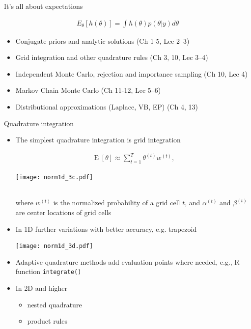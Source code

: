 \documentclass[english,t]{beamer}
\DeclareMathOperator{\E}{E}
\begin{document}
 \begin{frame}{It's all about expectations}

   \begin{align*}
   E_{\theta}[h(\theta)] = \int h(\theta) p(\theta|y) d\theta
   \end{align*}

  \begin{itemize}
  \item Conjugate priors and analytic solutions (Ch 1-5, Lec 2--3)
  \item Grid integration and other quadrature rules (Ch 3, 10, Lec 3--4)
  \item Independent Monte Carlo, rejection and importance sampling (Ch 10, Lec 4)
  \item Markov Chain Monte Carlo (Ch 11-12, Lec 5--6)
  \item {\color{gray}Distributional approximations (Laplace, VB, EP) (Ch 4, 13)}
  \end{itemize}
   

 \end{frame}


\begin{frame}{Quadrature integration}

  \begin{itemize}
  \item The simplest quadrature integration is grid integration\\
    \hspace{0cm}\begin{minipage}{3.5cm}
    \begin{align*}
      \E[\theta] \approx \sum_{t=1}^{T} \theta^{(t)}w^{(t)} ,
    \end{align*}
  \end{minipage}
  \begin{minipage}{6cm}
  \texttt{[image: norm1d\_3c.pdf]}
\end{minipage}\\
where $w^{(t)}$ is the normalized probability of a grid cell $t$, and $\alpha^{(t)}$ and $\beta^{(t)}$ are center locations of grid cells
\item<2-> In 1D further variations with better accuracy, e.g. trapezoid
  \begin{center}
    \texttt{[image: norm1d\_3d.pdf]}
  \end{center}
  \vspace{-0.7\baselineskip}
\item<3-> Adaptive quadrature methods add evaluation points where needed{\color{gray}, e.g., R function \texttt{integrate()}}
\item<4-> In 2D and higher
  \begin{itemize}
  \item nested quadrature
  \item product rules
  \end{itemize}
  \end{itemize}
  
\end{frame}
\end{document}
